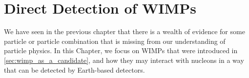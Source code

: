 \chapter{Direct Detection of WIMPs}
\label{chap:detection_theory}
\par
We have seen in the previous chapter that there is a wealth of evidence for some particle or particle combination that is missing from our understanding of particle physics.
In this Chapter, we focus on WIMPs that were introduced in \autoref{sec:wimp_as_a_candidate}, and how they may interact with nucleons in a way that can be detected by Earth-based detectors.





